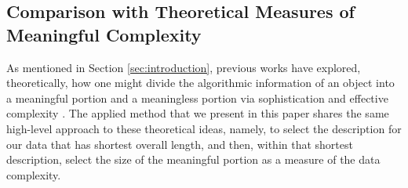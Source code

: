 \documentclass[a4paper,fleqn]{cas-sc}
\theoremstyle{remark}
\begin{document}
\subsection{Comparison with Theoretical Measures of Meaningful Complexity} \label{subsec:comparison-to-theoretical}
As mentioned in Section \ref{sec:introduction}, previous works have explored, theoretically, how one might divide the algorithmic information of an object into a meaningful portion and a meaningless portion via sophistication \citep{vitanyi2006meaningful,koppel1987complexity} and effective complexity \citep{ay2010effective,gell1996information}. The applied method that we present in this paper shares the same high-level approach to these theoretical ideas, namely, to select the description for our data that has shortest overall length, and then, within that shortest description, select the size of the meaningful portion as a measure of the data complexity. 
\end{document}
